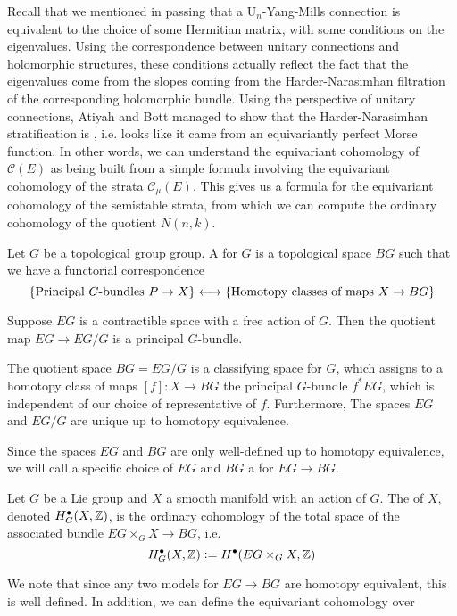 Recall that we mentioned in passing that a $\mathrm{U}_n$-Yang-Mills connection is
equivalent to the choice of some Hermitian matrix, with some conditions
on the eigenvalues. Using the correspondence between unitary connections
and holomorphic structures, these conditions actually reflect the fact
that the eigenvalues come from the slopes coming from the
Harder-Narasimhan filtration of the corresponding holomorphic bundle.
Using the perspective of unitary connections, Atiyah and Bott managed to show that
the Harder-Narasimhan stratification is ,
i.e. looks like it came from an equivariantly perfect Morse function. In
other words, we can understand the equivariant cohomology of $\mathscr{C}(E)$
as being built from a simple formula involving the equivariant cohomology
of the strata $\mathscr{C}_\mu(E)$. This gives us a formula
for the equivariant cohomology of the semistable strata, from which
we can compute the ordinary cohomology of the quotient $N(n,k)$.
%
\begin{defn}
Let $G$ be a topological group group. A  for $G$ is a topological
space $BG$ such that we have a functorial correspondence
\[
\left\lbrace \text{Principal }G\text{-bundles } P \to X \right\rbrace \longleftrightarrow
\left\lbrace \text{Homotopy classes of maps }X \to BG \right\rbrace
\]
\end{defn}
%
Suppose $EG$ is a contractible space with a free action of $G$. Then the quotient
map $EG \to EG/G$ is a principal $G$-bundle.
%
\begin{thm}
The quotient space $BG = EG/G$ is a classifying space for $G$, which assigns to
a homotopy class of maps $[f] : X \to BG$ the principal $G$-bundle $f^*EG$,
which is independent of our choice of representative of $f$. Furthermore,
The spaces $EG$ and $EG/G$ are unique up to homotopy equivalence.
\end{thm}
%
Since the spaces $EG$ and $BG$ are only well-defined up to homotopy equivalence,
we will call a specific choice of $EG$ and $BG$ a  for $EG \to BG$.
%
\begin{defn}
Let $G$ be a Lie group and $X$ a smooth manifold with an action of $G$. The
 of $X$, denoted $H^\bullet_G(X,\mathbb{Z})$, is the
ordinary cohomology of the total space of the associated bundle
$EG\times_G X \to BG$, i.e.
\[
H^\bullet_G(X,\mathbb{Z}) \vcentcolon= H^\bullet(EG\times_G X,\mathbb{Z})
\]
\end{defn}
%
We note that since any two models for $EG \to BG$ are homotopy equivalent,
this is well defined. In addition, we can define the equivariant cohomology over

